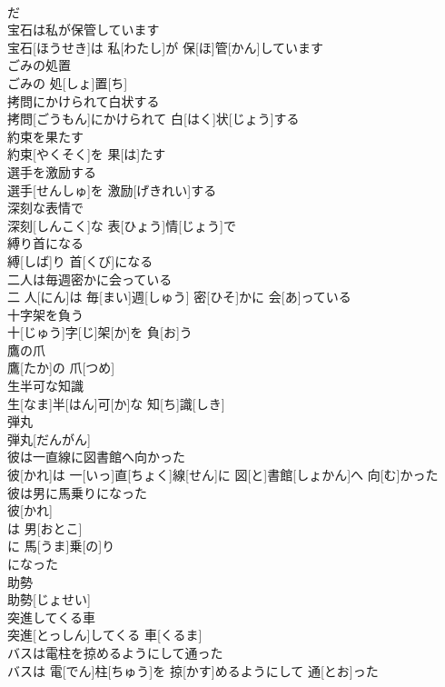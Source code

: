 \documentclass[8pt]{extreport}
\begin{document}
\begin{CJK}{UTF8}{min}
\\	だ
\\	宝石は私が保管しています	
\\	宝石[ほうせき]は 私[わたし]が 保[ほ]管[かん]しています
\\	ごみの処置	
\\	ごみの 処[しょ]置[ち]
\\	拷問にかけられて白状する	
\\	拷問[ごうもん]にかけられて 白[はく]状[じょう]する
\\	約束を果たす	
\\	約束[やくそく]を 果[は]たす
\\	選手を激励する	
\\	選手[せんしゅ]を 激励[げきれい]する
\\	深刻な表情で	
\\	深刻[しんこく]な 表[ひょう]情[じょう]で
\\	縛り首になる	
\\	縛[しば]り 首[くび]になる
\\	二人は毎週密かに会っている	
\\	二 人[にん]は 毎[まい]週[しゅう] 密[ひそ]かに 会[あ]っている
\\	十字架を負う	
\\	十[じゅう]字[じ]架[か]を 負[お]う
\\	鷹の爪	
\\	鷹[たか]の 爪[つめ]
\\	生半可な知識	
\\	生[なま]半[はん]可[か]な 知[ち]識[しき]
\\	弾丸	
\\	弾丸[だんがん]
\\	彼は一直線に図書館へ向かった	
\\	彼[かれ]は 一[いっ]直[ちょく]線[せん]に 図[と]書館[しょかん]へ 向[む]かった
\\	彼は男に馬乗りになった	
\\	彼[かれ]
\\	は 男[おとこ]
\\	に 馬[うま]乗[の]り 
\\	になった 
\\	助勢	
\\	助勢[じょせい]
\\	突進してくる車	
\\	突進[とっしん]してくる 車[くるま]
\\	バスは電柱を掠めるようにして通った	
\\	バスは 電[でん]柱[ちゅう]を 掠[かす]めるようにして 通[とお]った

\end{CJK}
\end{document}
